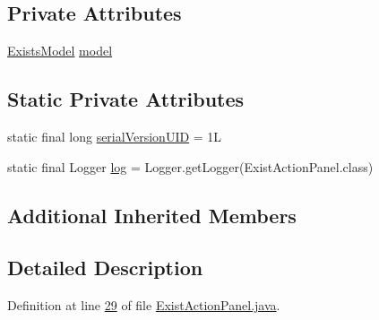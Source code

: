 \subsection*{Private Attributes}
\begin{DoxyCompactItemize}
\item 
\hyperlink{classcom_1_1poly_1_1nlp_1_1filekommander_1_1views_1_1models_1_1_exists_model}{Exists\-Model} \hyperlink{classcom_1_1poly_1_1nlp_1_1filekommander_1_1views_1_1panels_1_1_exist_action_panel_add9b7fcb99ef9867cf66a4a43fd0ba2b}{model}
\end{DoxyCompactItemize}
\subsection*{Static Private Attributes}
\begin{DoxyCompactItemize}
\item 
static final long \hyperlink{classcom_1_1poly_1_1nlp_1_1filekommander_1_1views_1_1panels_1_1_exist_action_panel_af73a2ecd32f1203c4025ed2a8d0651d4}{serial\-Version\-U\-I\-D} = 1\-L
\item 
static final Logger \hyperlink{classcom_1_1poly_1_1nlp_1_1filekommander_1_1views_1_1panels_1_1_exist_action_panel_a8aa597230d90247bd48376a632fcbf0e}{log} = Logger.\-get\-Logger(Exist\-Action\-Panel.\-class)
\end{DoxyCompactItemize}
\subsection*{Additional Inherited Members}


\subsection{Detailed Description}


Definition at line \hyperlink{L29}{29} of file \hyperlink{}{Exist\-Action\-Panel.\-java}.



